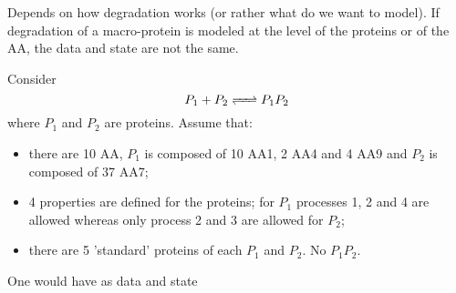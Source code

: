 \medskip

Depends on how degradation works (or rather what do we want to model). If degradation of a macro-protein is modeled at the level of the proteins or of the AA, the data and state are not the same.

\medskip

Consider
$$
  \reactionRev{P_1+P_2}{P_1P_2}{}{}
$$
where $P_1$ and $P_2$ are proteins. Assume that:
\begin{itemize}
  \item there are 10 AA, $P_1$ is composed of 10 AA1, 2 AA4 and 4 AA9 and $P_2$ is composed of 37 AA7;
  \item 4 properties are defined for the proteins; for $P_1$ processes 1, 2 and 4 are allowed whereas only process 2 and 3 are allowed for $P_2$;
  \item there are 5 'standard' proteins of each $P_1$ and $P_2$. No $P_1P_2$.
\end{itemize}
One would have as data and state
